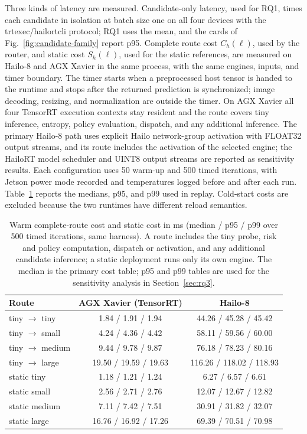 \documentclass[a4paper,5p]{elsarticle}
\begin{document}
Three kinds of latency are measured. Candidate-only latency, used for RQ1, times each candidate in isolation at batch size one on all four devices with the trtexec/hailortcli protocol; RQ1 uses the mean, and the cards of Fig.~\ref{fig:candidate-family} report p95. Complete route cost $C_h(\ell)$, used by the router, and static cost $S_h(\ell)$, used for the static references, are measured on Hailo-8 and AGX Xavier in the same process, with the same engines, inputs, and timer boundary. The timer starts when a preprocessed host tensor is handed to the runtime and stops after the returned prediction is synchronized; image decoding, resizing, and normalization are outside the timer. On AGX Xavier all four TensorRT execution contexts stay resident and the route covers tiny inference, entropy, policy evaluation, dispatch, and any additional inference. The primary Hailo-8 path uses explicit Hailo network-group activation with FLOAT32 output streams, and its route includes the activation of the selected engine; the HailoRT model scheduler and UINT8 output streams are reported as sensitivity results. Each configuration uses 50 warm-up and 500 timed iterations, with Jetson power mode recorded and temperatures logged before and after each run. Table~\ref{tab:routes} reports the medians, p95, and p99 used in replay. Cold-start costs are excluded because the two runtimes have different reload semantics.

\begin{table}[!t]
\centering
\caption{Warm complete-route cost and static cost in ms (median / p95 / p99 over 500 timed iterations, same harness). A route includes the tiny probe, risk and policy computation, dispatch or activation, and any additional candidate inference; a static deployment runs only its own engine. The median is the primary cost table; p95 and p99 tables are used for the sensitivity analysis in Section~\ref{sec:rq3}.}
\label{tab:routes}
\footnotesize
\setlength{\tabcolsep}{3pt}
\begin{tabular}{@{}lcc@{}}
\toprule
Route & AGX Xavier (TensorRT) & Hailo-8 \\
\midrule
tiny $\rightarrow$ tiny & 1.84 / 1.91 / 1.94 & 44.26 / 45.28 / 45.42 \\
tiny $\rightarrow$ small & 4.24 / 4.36 / 4.42 & 58.11 / 59.56 / 60.00 \\
tiny $\rightarrow$ medium & 9.44 / 9.78 / 9.87 & 76.18 / 78.23 / 80.16 \\
tiny $\rightarrow$ large & 19.50 / 19.59 / 19.63 & 116.26 / 118.02 / 118.93 \\
\midrule
static tiny & 1.18 / 1.21 / 1.24 & 6.27 / 6.57 / 6.61 \\
static small & 2.56 / 2.71 / 2.76 & 12.07 / 12.67 / 12.82 \\
static medium & 7.11 / 7.42 / 7.51 & 30.91 / 31.82 / 32.07 \\
static large & 16.76 / 16.92 / 17.26 & 69.39 / 70.51 / 70.98 \\
\bottomrule
\end{tabular}
\end{table}
\end{document}
